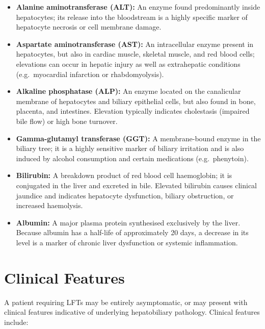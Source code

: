 \begin{itemize}
    \item \textbf{Alanine aminotransferase (ALT):} An enzyme found predominantly inside hepatocytes; its release into the bloodstream is a highly specific marker of hepatocyte necrosis or cell membrane damage.
    \item \textbf{Aspartate aminotransferase (AST):} An intracellular enzyme present in hepatocytes, but also in cardiac muscle, skeletal muscle, and red blood cells; elevations can occur in hepatic injury as well as extrahepatic conditions (e.g.\ myocardial infarction or rhabdomyolysis).
    \item \textbf{Alkaline phosphatase (ALP):} An enzyme located on the canalicular membrane of hepatocytes and biliary epithelial cells, but also found in bone, placenta, and intestines. Elevation typically indicates cholestasis (impaired bile flow) or high bone turnover.
    \item \textbf{Gamma-glutamyl transferase (GGT):} A membrane-bound enzyme in the biliary tree; it is a highly sensitive marker of biliary irritation and is also induced by alcohol consumption and certain medications (e.g.\ phenytoin).
    \item \textbf{Bilirubin:} A breakdown product of red blood cell haemoglobin; it is conjugated in the liver and excreted in bile. Elevated bilirubin causes clinical jaundice and indicates hepatocyte dysfunction, biliary obstruction, or increased haemolysis.
    \item \textbf{Albumin:} A major plasma protein synthesised exclusively by the liver. Because albumin has a half-life of approximately 20 days, a decrease in its level is a marker of chronic liver dysfunction or systemic inflammation.
\end{itemize}

\section*{Clinical Features}
A patient requiring LFTs may be entirely asymptomatic, or may present with clinical features indicative of underlying hepatobiliary pathology. Clinical features include:

